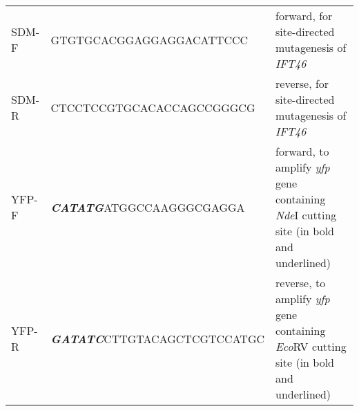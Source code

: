 \begin{longtable}{lXX @{}}
SDM-F & GTGTGCACGGAGGAGGACAT\allowbreak TCCC & forward, for site-directed mutagenesis of \textit{IFT46}\\
SDM-R & CTCCTCCGTGCACACCAGCC\allowbreak GGGCG & reverse, for site-directed mutagenesis of \textit{IFT46}\\
YFP-F & \emph{\textbf{CATATG}}ATGGCCAAGGGCGA\allowbreak GGA & forward, to amplify \textit{yfp} gene containing \textit{Nde}I cutting site (in bold and underlined)\\
YFP-R & \emph{\textbf{GATATC}}CTTGTACAGCTCGT\allowbreak CCATGC & reverse, to amplify \textit{yfp} gene containing \textit{Eco}RV cutting site (in bold and underlined)\\
\bottomrule
\end{longtable}